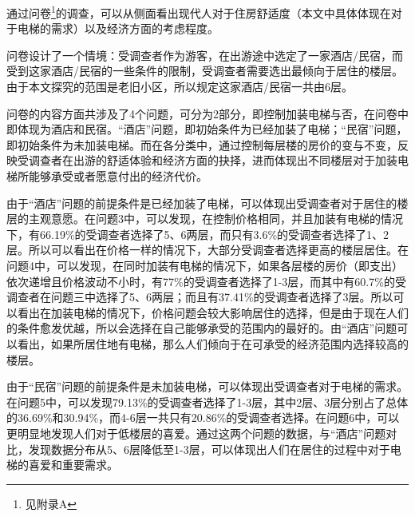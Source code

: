 \documentclass[lang=cn,a4paper]{elegantpaper}
\begin{document}
    通过问卷\footnote{见附录A}的调查，可以从侧面看出现代人对于住房舒适度（本文中具体体现在对于电梯的需求）以及经济方面的考虑程度。

    问卷设计了一个情境：受调查者作为游客，在出游途中选定了一家酒店/民宿，而受到这家酒店/民宿的一些条件的限制，受调查者需要选出最倾向于居住的楼层。由于本文探究的范围是老旧小区，所以规定这家酒店/民宿一共由6层。

    问卷的内容方面共涉及了4个问题，可分为2部分，即控制加装电梯与否，在问卷中即体现为酒店和民宿。“酒店”问题，即初始条件为已经加装了电梯；“民宿”问题，即初始条件为未加装电梯。而在各分类中，通过控制每层楼的房价的变与不变，反映受调查者在出游的舒适体验和经济方面的抉择，进而体现出不同楼层对于加装电梯所能够承受或者愿意付出的经济代价。
    
    由于“酒店”问题的前提条件是已经加装了电梯，可以体现出受调查者对于居住的楼层的主观意愿。在问题3中，可以发现，在控制价格相同，并且加装有电梯的情况下，有66.19\%的受调查者选择了5、6两层，而只有3.6\%的受调查者选择了1、2层。所以可以看出在价格一样的情况下，大部分受调查者选择更高的楼层居住。在问题4中，可以发现，在同时加装有电梯的情况下，如果各层楼的房价（即支出）依次递增且价格波动不小时，有77\%的受调查者选择了1-3层，而其中有60.7\%的受调查者在问题三中选择了5、6两层；而且有37.41\%的受调查者选择了3层。所以可以看出在加装电梯的情况下，价格问题会较大影响居住的选择，但是由于现在人们的条件愈发优越，所以会选择在自己能够承受的范围内的最好的。由“酒店”问题可以看出，如果所居住地有电梯，那么人们倾向于在可承受的经济范围内选择较高的楼层。

    由于“民宿”问题的前提条件是未加装电梯，可以体现出受调查者对于电梯的需求。在问题5中，可以发现79.13\%的受调查者选择了1-3层，其中2层、3层分别占了总体的36.69\%和30.94\%，而4-6层一共只有20.86\%的受调查者选择。在问题6中，可以更明显地发现人们对于低楼层的喜爱。通过这两个问题的数据，与“酒店”问题对比，发现数据分布从5、6层降低至1-3层，可以体现出人们在居住的过程中对于电梯的喜爱和重要需求。

\end{document}
